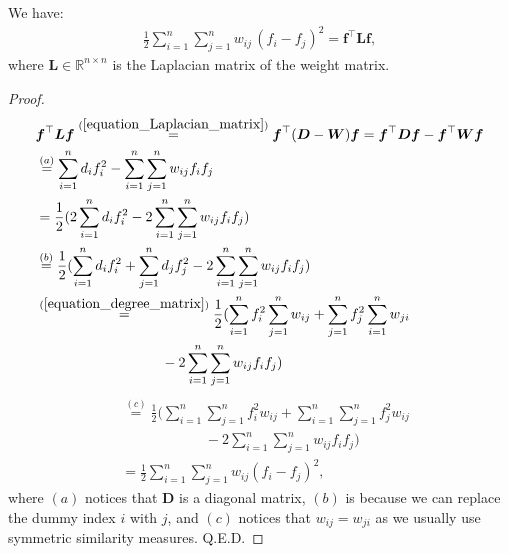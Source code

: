 \documentclass[lang=cn,10pt]{gorgeousnbook}
\numberwithin{equation}{section}%
\numberwithin{figure}{section}%
\begin{document}
\begin{proposition}\label{proposition_spectral_clustering_f_L_f}
We have:
\begin{align}
\frac{1}{2} \sum_{i=1}^n \sum_{j=1}^n w_{ij}\, (f_i - f_j)^2 = \boldsymbol{f}^\top \boldsymbol{L} \boldsymbol{f},
\end{align}
where $\boldsymbol{L} \in \mathbb{R}^{n \times n}$ is the Laplacian matrix of the weight matrix.
\end{proposition}
\begin{proof}
\begin{align*}
&\boldsymbol{f}^\top \boldsymbol{L} \boldsymbol{f} \overset{(\ref{equation_Laplacian_matrix})}{=} \boldsymbol{f}^\top (\boldsymbol{D} - \boldsymbol{W}) \boldsymbol{f} = \boldsymbol{f}^\top \boldsymbol{D} \boldsymbol{f} - \boldsymbol{f}^\top \boldsymbol{W} \boldsymbol{f} \\
&\overset{(a)}{=} \sum_{i=1}^n d_i f_i^2 - \sum_{i=1}^n \sum_{j=1}^n w_{ij} f_i f_j \\
&= \frac{1}{2} (2\sum_{i=1}^n d_i f_i^2 - 2\sum_{i=1}^n \sum_{j=1}^n w_{ij} f_i f_j) \\
&\overset{(b)}{=} \frac{1}{2} (\sum_{i=1}^n d_i f_i^2 + \sum_{j=1}^n d_j f_j^2 - 2\sum_{i=1}^n \sum_{j=1}^n w_{ij} f_i f_j) \\
&\overset{(\ref{equation_degree_matrix})}{=} \frac{1}{2} (\sum_{i=1}^n f_i^2 \sum_{j=1}^n w_{ij} + \sum_{j=1}^n f_j^2 \sum_{i=1}^n w_{ji} \\
&~~~~~~~~~~~~~~~~~~~~~~~~~~~ - 2\sum_{i=1}^n \sum_{j=1}^n w_{ij} f_i f_j) 
\end{align*}
\begin{align*}
&\overset{(c)}{=} \frac{1}{2} (\sum_{i=1}^n \sum_{j=1}^n f_i^2 w_{ij} + \sum_{i=1}^n \sum_{j=1}^n f_j^2 w_{ij} \\
&~~~~~~~~~~~~~~~~~~~~~~~~~~~ - 2\sum_{i=1}^n \sum_{j=1}^n w_{ij} f_i f_j) \\
&= \frac{1}{2} \sum_{i=1}^n \sum_{j=1}^n w_{ij} (f_i - f_j)^2,
\end{align*}
where $(a)$ notices that $\boldsymbol{D}$ is a diagonal matrix, $(b)$ is because we can replace the dummy index $i$ with $j$, and $(c)$ notices that $w_{ij} = w_{ji}$ as we usually use symmetric similarity measures. Q.E.D.
\end{proof}
\end{document}
